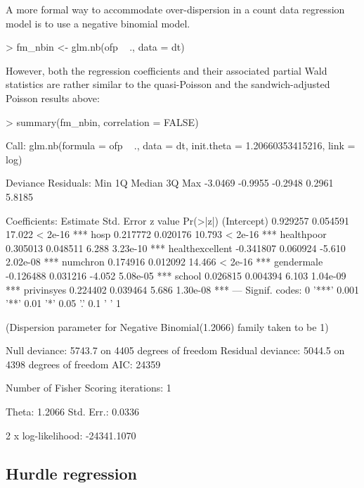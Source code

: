 \documentclass{Z}
\begin{document}
A more formal way to accommodate over-dispersion in a count data regression
model is to use a negative binomial model.
\begin{Schunk}
\begin{Sinput}
> fm_nbin <- glm.nb(ofp ~ ., data = dt)
\end{Sinput}
\end{Schunk}
However, both the regression coefficients and their associated partial Wald
statistics are rather similar to the quasi-Poisson and the sandwich-adjusted
Poisson results above:
\begin{Schunk}
\begin{Sinput}
> summary(fm_nbin, correlation = FALSE)
\end{Sinput}
\begin{Soutput}
Call:
glm.nb(formula = ofp ~ ., data = dt, init.theta = 1.20660353415216, 
    link = log)

Deviance Residuals: 
    Min       1Q   Median       3Q      Max  
-3.0469  -0.9955  -0.2948   0.2961   5.8185  

Coefficients:
                 Estimate Std. Error z value Pr(>|z|)    
(Intercept)      0.929257   0.054591  17.022  < 2e-16 ***
hosp             0.217772   0.020176  10.793  < 2e-16 ***
healthpoor       0.305013   0.048511   6.288 3.23e-10 ***
healthexcellent -0.341807   0.060924  -5.610 2.02e-08 ***
numchron         0.174916   0.012092  14.466  < 2e-16 ***
gendermale      -0.126488   0.031216  -4.052 5.08e-05 ***
school           0.026815   0.004394   6.103 1.04e-09 ***
privinsyes       0.224402   0.039464   5.686 1.30e-08 ***
---
Signif. codes:  0 '***' 0.001 '**' 0.01 '*' 0.05 '.' 0.1 ' ' 1 

(Dispersion parameter for Negative Binomial(1.2066) family taken to be 1)

    Null deviance: 5743.7  on 4405  degrees of freedom
Residual deviance: 5044.5  on 4398  degrees of freedom
AIC: 24359

Number of Fisher Scoring iterations: 1


              Theta:  1.2066 
          Std. Err.:  0.0336 

 2 x log-likelihood:  -24341.1070 
\end{Soutput}
\end{Schunk}

\subsection{Hurdle regression}
\end{document}
